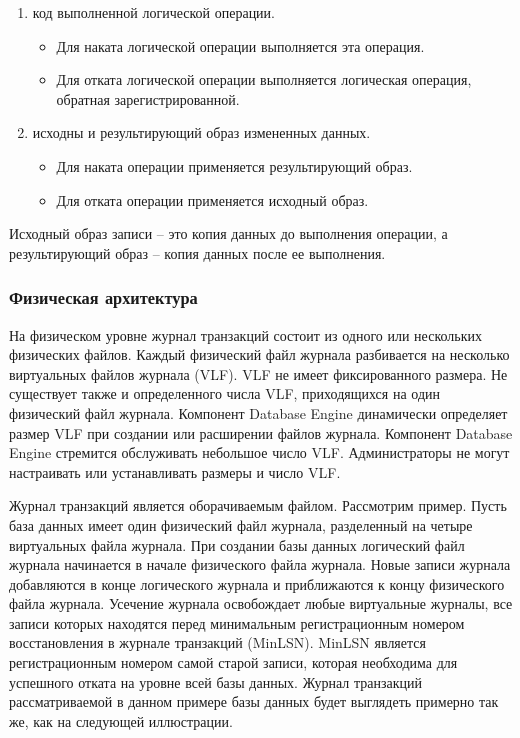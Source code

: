 \begin{enumerate}
	\item код выполненной логической операции.
	\begin{itemize}
		\item Для наката логической операции выполняется эта операция.
		\item Для отката логической операции выполняется логическая операция, обратная зарегистрированной.
	\end{itemize}
	\item исходны и результирующий образ измененных данных.
	\begin{itemize}
		\item Для наката операции применяется результирующий образ.
		\item Для отката операции применяется исходный образ.
	\end{itemize}
\end{enumerate}

Исходный образ записи – это копия данных до выполнения операции, а результирующий образ – копия данных после ее выполнения. 

\subsubsection{Физическая архитектура}

На физическом уровне журнал транзакций состоит из одного или
нескольких физических файлов. Каждый физический файл журнала
разбивается на несколько виртуальных файлов журнала (VLF). VLF не
имеет фиксированного размера. Не существует также и определенного
числа VLF, приходящихся на один физический файл журнала. Компонент
Database Engine динамически определяет размер VLF при создании или
расширении файлов журнала. Компонент Database Engine стремится
обслуживать небольшое число VLF. Администраторы не могут настраивать
или устанавливать размеры и число VLF.

Журнал транзакций является оборачиваемым файлом. Рассмотрим
пример. Пусть база данных имеет один физический файл журнала,
разделенный на четыре виртуальных файла журнала. При создании базы
данных логический файл журнала начинается в начале физического файла
журнала. Новые записи журнала добавляются в конце логического журнала
и приближаются к концу физического файла журнала. Усечение журнала
освобождает любые виртуальные журналы, все записи которых находятся
перед минимальным регистрационным номером восстановления в журнале
транзакций (MinLSN). MinLSN является регистрационным номером самой
старой записи, которая необходима для успешного отката на уровне всей базы данных. Журнал транзакций рассматриваемой в данном примере
базы данных будет выглядеть примерно так же, как на следующей
иллюстрации.

